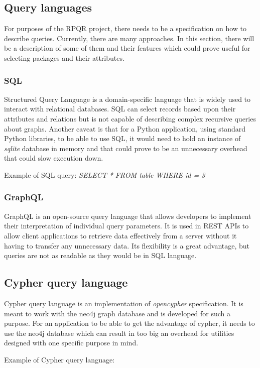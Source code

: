 \subsection*{Query languages}
For purposes of the RPQR project, there needs to be a specification on how to describe queries. Currently,
there are many approaches. In this section, there will be a description of some of them and their features
which could prove useful for selecting packages and their attributes.

\subsubsection*{SQL}
Structured Query Language\cite{SQL} is a domain-specific language that is widely used to interact with
relational databases. SQL can select records based upon their attributes and relations but
is not capable of describing complex recursive queries about graphs. Another caveat is that for a Python
application, using standard Python libraries, to be able to use SQL, it would need to hold an instance of \textit{sqlite} database in memory and
that could prove to be an unnecessary overhead that could slow execution down.

Example of SQL query:
\textit{SELECT * FROM table WHERE id = 3}

\subsubsection*{GraphQL}
GraphQL\cite{GraphQL} is an open-source query language that allows developers to implement their interpretation
of individual query parameters. It is used in REST APIs to allow client applications to retrieve data
effectively from a server without it having to transfer any unnecessary data. Its flexibility is
a great advantage, but queries are not as readable as they would be in SQL language.

\subsection*{Cypher query language}
Cypher query language is an implementation of \textit{opencypher} specification. It is meant to work with
the neo4j graph database and is developed for such a purpose. For an application to be able to get the advantage
of cypher, it needs to use the neo4j database which can result in too big an overhead for utilities
designed with one specific purpose in mind.

Example of Cypher query language:

